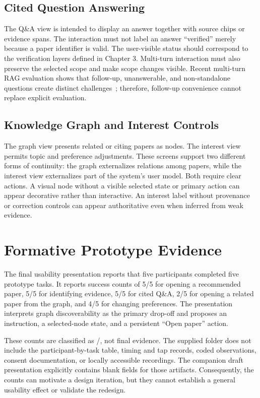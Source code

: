 \subsection{Cited Question Answering}

The Q\&A view is intended to display an answer together with source chips or evidence spans.
The interaction must not label an answer ``verified'' merely because a paper identifier is valid.
The user-visible status should correspond to the verification layers defined in Chapter 3.
Multi-turn interaction must also preserve the selected scope and make scope changes visible.
Recent multi-turn RAG evaluation shows that follow-up, unanswerable, and non-standalone questions create distinct challenges~\cite{katsis2025mtrag}; therefore, follow-up convenience cannot replace explicit evaluation.

\subsection{Knowledge Graph and Interest Controls}

The graph view presents related or citing papers as nodes.
The interest view permits topic and preference adjustments.
These screens support two different forms of continuity: the graph externalizes relations among papers, while the interest view externalizes part of the system's user model.
Both require clear actions.
A visual node without a visible selected state or primary action can appear decorative rather than interactive.
An interest label without provenance or correction controls can appear authoritative even when inferred from weak evidence.

\section{Formative Prototype Evidence}

The final usability presentation reports that five participants completed five prototype tasks.
It reports success counts of 5/5 for opening a recommended paper, 5/5 for identifying evidence, 5/5 for cited Q\&A, 2/5 for opening a related paper from the graph, and 4/5 for changing preferences.
The presentation interprets graph discoverability as the primary drop-off and proposes an instruction, a selected-node state, and a persistent ``Open paper'' action.

These counts are classified as \observed{}/\limited{}, not \measured{} final evidence.
The supplied folder does not include the participant-by-task table, timing and tap records, coded observations, consent documentation, or locally accessible recordings.
The companion draft presentation explicitly contains blank fields for those artifacts.
Consequently, the counts can motivate a design iteration, but they cannot establish a general usability effect or validate the redesign.

